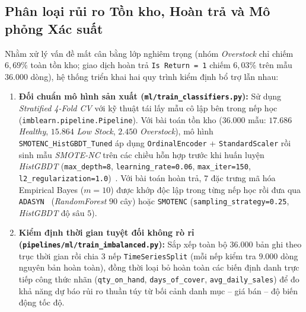 \subsection{Phân loại rủi ro Tồn kho, Hoàn trả và Mô phỏng Xác suất}
\label{sec:ch4-ml-classify}
Nhằm xử lý vấn đề mất cân bằng lớp nghiêm trọng (nhóm \textit{Overstock} chỉ chiếm $6{,}69\%$ toàn tồn kho; giao dịch hoàn trả \texttt{Is Return = 1} chiếm $6{,}03\%$ trên mẫu $36.000$ dòng), hệ thống triển khai hai quy trình kiểm định bổ trợ lẫn nhau:
\begin{enumerate}[label=\textit{\arabic*},topsep=0pt, itemsep=1pt]
	\item \textbf{Đối chuẩn mô hình sản xuất (\texttt{ml/train_classifiers.py}):} Sử dụng \textit{Stratified 4-Fold CV} với kỹ thuật tái lấy mẫu cô lập bên trong nếp học (\texttt{imblearn.pipeline.Pipeline}). Với bài toán tồn kho ($36.000$ mẫu: $17.686$ \textit{Healthy}, $15.864$ \textit{Low Stock}, $2.450$ \textit{Overstock}), mô hình \texttt{SMOTENC_HistGBDT_Tuned} áp dụng \texttt{OrdinalEncoder} + \texttt{StandardScaler} rồi sinh mẫu \textit{SMOTE-NC} trên các chiều hỗn hợp trước khi huấn luyện \textit{HistGBDT} (\texttt{max_depth=8}, \texttt{learning_rate=0.06}, \texttt{max_iter=150}, \texttt{l2\_\allowbreak{}regularization=1.0})~\cite{chawla2002smote}. Với bài toán hoàn trả, $7$ đặc trưng mã hóa Empirical Bayes ($m=10$) được khớp độc lập trong từng nếp học rồi đưa qua \texttt{ADASYN}~\cite{he2008adasyn} (\textit{RandomForest} $90$ cây) hoặc \texttt{SMOTENC} (\texttt{sampling\_\allowbreak{}strategy=0.25}, \textit{HistGBDT} độ sâu $5$).
	\item \textbf{Kiểm định thời gian tuyệt đối không rò rỉ (\texttt{pipelines/ml/train_imbalanced.py}):} Sắp xếp toàn bộ $36.000$ bản ghi theo trục thời gian rồi chia $3$ nếp \texttt{TimeSeriesSplit} (mỗi nếp kiểm tra $9.000$ dòng nguyên bản hoàn toàn), đồng thời loại bỏ hoàn toàn các biến định danh trực tiếp công thức nhãn (\texttt{qty_on_hand}, \texttt{days_of_cover}, \texttt{avg_daily_sales}) để đo khả năng dự báo rủi ro thuần túy từ bối cảnh danh mục -- giá bán -- độ biến động tốc độ.
\end{enumerate}

